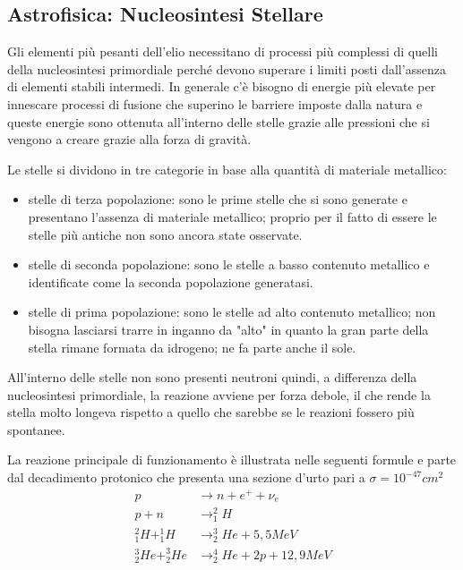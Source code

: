 \subsection{Astrofisica: Nucleosintesi Stellare}

Gli elementi più pesanti dell'elio necessitano di processi più complessi di quelli della nucleosintesi primordiale perché devono superare i limiti posti dall'assenza di elementi stabili intermedi.
In generale c'è bisogno di energie più elevate per innescare processi di fusione che superino le barriere imposte dalla natura e queste energie sono ottenuta all'interno delle stelle grazie alle pressioni che si vengono a creare grazie alla forza di gravità.

Le stelle si dividono in tre categorie in base alla quantità di materiale metallico:
\begin{itemize}
\item stelle di terza popolazione: sono le prime stelle che si sono generate e presentano l'assenza di materiale metallico; proprio per il fatto di essere le stelle più antiche non sono ancora state osservate.
\item stelle di seconda popolazione: sono le stelle a basso contenuto metallico e identificate come la seconda popolazione generatasi.
\item stelle di prima popolazione: sono le stelle ad alto contenuto metallico; non bisogna lasciarsi trarre in inganno da "alto" in quanto la gran parte della stella rimane formata da idrogeno; ne fa parte anche il sole.
\end{itemize}

All'interno delle stelle non sono presenti neutroni quindi, a differenza della nucleosintesi primordiale, la reazione avviene per forza debole, il che rende la stella molto longeva rispetto a quello che sarebbe se le reazioni fossero più spontanee.

La reazione principale di funzionamento è illustrata nelle seguenti formule e parte dal decadimento protonico che presenta una sezione d'urto pari a $\sigma =10^{-47}cm^2$
\begin{equation}
\begin{split}
p&\longrightarrow n+e^++\nu_e\\
p+n&\longrightarrow ^2_1H\\
^2_1H+^1_1H&\longrightarrow ^3_2He+5,5MeV\\
^3_2He+^3_2He&\longrightarrow ^4_2He+2p+12,9MeV
\end{split}
\end{equation}

